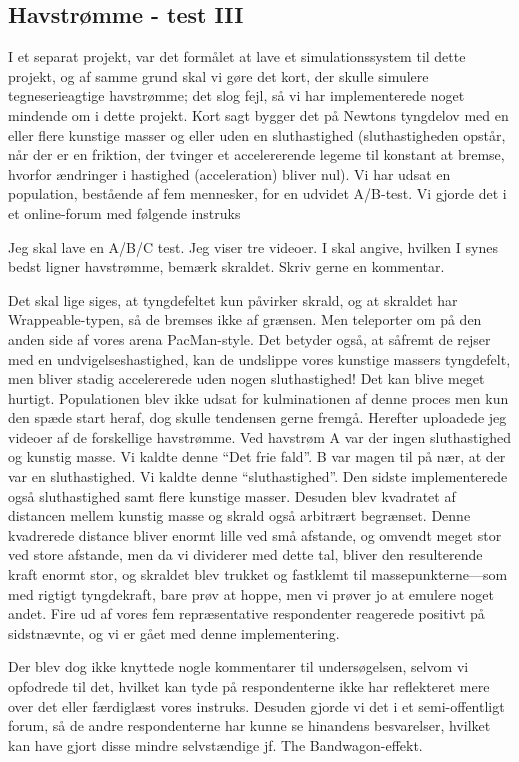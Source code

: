 \subsection{Havstrømme - test III}
I et separat projekt, var det formålet at lave et simulationssystem til dette projekt, og af samme grund skal vi gøre det kort, der skulle simulere tegneserieagtige havstrømme; det slog fejl, så vi har implementerede noget mindende om i dette projekt. Kort sagt bygger det på Newtons tyngdelov med en eller flere kunstige masser og eller uden en sluthastighed (sluthastigheden opstår, når der er en friktion, der tvinger et accelererende legeme til konstant at bremse, hvorfor ændringer i hastighed (acceleration) bliver nul). Vi har udsat en population, bestående af fem mennesker, for en udvidet A/B-test. Vi gjorde det i et online-forum med følgende instruks
\begin{displayquote}
Jeg skal lave en A/B/C test. Jeg viser tre videoer. I skal angive, hvilken I synes bedst ligner havstrømme, bemærk skraldet. Skriv gerne en kommentar.
\end{displayquote}
Det skal lige siges, at tyngdefeltet kun påvirker skrald, og at skraldet har Wrappeable-typen, så de bremses ikke af grænsen. Men teleporter om på den anden side af vores arena PacMan-style. Det betyder også, at såfremt de rejser med en undvigelseshastighed, kan de undslippe vores kunstige massers tyngdefelt, men bliver stadig accelererede uden nogen sluthastighed! Det kan blive meget hurtigt. Populationen blev ikke udsat for kulminationen af denne proces men kun den spæde start heraf, dog skulle tendensen gerne fremgå.
Herefter uploadede jeg videoer af de forskellige havstrømme. Ved havstrøm A var der ingen sluthastighed og kunstig masse. Vi kaldte denne ``Det frie fald''. B var magen til på nær, at der var en sluthastighed. Vi kaldte denne ``sluthastighed''. Den sidste implementerede også sluthastighed samt flere kunstige masser. Desuden blev kvadratet af distancen mellem kunstig masse og skrald også arbitrært begrænset. Denne kvadrerede distance bliver enormt lille ved små afstande, og omvendt meget stor ved store afstande, men da vi dividerer med dette tal, bliver den resulterende kraft enormt stor, og skraldet blev trukket og fastklemt til massepunkterne---som med rigtigt tyngdekraft, bare prøv at hoppe, men vi prøver jo at emulere noget andet. Fire ud af vores fem repræsentative respondenter reagerede positivt på sidstnævnte, og vi er gået med denne implementering.

Der blev dog ikke knyttede nogle kommentarer til undersøgelsen, selvom vi opfodrede til det, hvilket kan tyde på respondenterne ikke har reflekteret mere over det eller færdiglæst vores instruks. Desuden gjorde vi det i et semi-offentligt forum, så de andre respondenterne har kunne se hinandens besvarelser, hvilket kan have gjort disse mindre selvstændige jf. The Bandwagon-effekt. 
